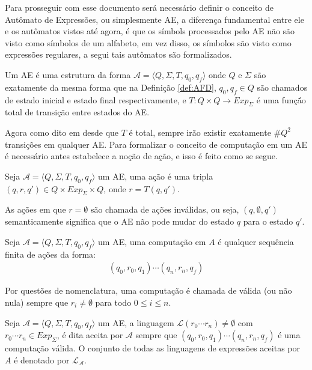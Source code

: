 Para prosseguir com esse documento será necessário definir o conceito de Autômato de Expressões, ou simplesmente AE, a diferença fundamental entre ele e os autômatos vistos até agora, é que os símbols processados pelo AE não são visto como símbolos de um alfabeto, em vez disso, os símbolos são visto como expressões regulares, a segui tais autômatos são formalizados.

\begin{definicao}\label{def:ExpressionAutomaton}
	Um AE é uma estrutura da forma $\mathcal{A} = \langle Q, \Sigma, T, q_0, q_f \rangle$ onde $Q$ e $\Sigma$ são exatamente da mesma forma que na Definição \ref{def:AFD}, $q_0, q_f \in Q$ são chamados de estado inicial e estado final respectivamente, e $T : Q \times Q \rightarrow Exp_\Sigma$ é uma funçã́o total de transição entre estados do AE.
\end{definicao}

Agora como dito em \cite{han2005} desde que $T$ é total, sempre irão existir exatamente $\# Q^2$ transições em qualquer AE. Para formalizar o conceito de computação em um AE é necessário antes estabelece a noção de ação, e isso é feito como se segue.

\begin{definicao}
	Seja $\mathcal{A} = \langle Q, \Sigma, T, q_0, q_f \rangle$ um AE, uma ação é uma tripla $(q, r, q') \in Q \times Exp_\Sigma \times Q$, onde $r = T(q, q')$.
\end{definicao}

As ações em que $r = \emptyset$ são chamada de ações inválidas, ou seja, $(q, \emptyset, q')$ semanticamente significa que o AE não pode mudar do estado $q$ para o estado $q'$.

\begin{definicao}[Computação em AE]
	Seja $\mathcal{A} = \langle Q, \Sigma, T, q_0, q_f \rangle$ um AE, uma computação em $A$ é qualquer sequência finita de ações da forma:
	\begin{eqnarray*}
		(q_0, r_0, q_1)\cdots (q_n, r_n, q_f)
	\end{eqnarray*}
\end{definicao}

\begin{nota}
	Por questões de nomenclatura, uma computação é chamada de válida (ou não nula) sempre que $r_i \neq \emptyset$ para todo $0 \leq i \leq n$.
\end{nota}

\begin{definicao}[Linguagens em um AE]
	Seja $\mathcal{A} = \langle Q, \Sigma, T, q_0, q_f \rangle$ um AE, a linguagem $\mathcal{L}(r_0\cdots r_n) \neq \emptyset$ com $r_0\cdots r_n \in Exp_\Sigma$, é dita aceita por $\mathcal{A}$ sempre que $(q_0, r_0, q_1)\cdots (q_n, r_n, q_f)$ é uma computação válida. O conjunto de todas as linguagens de expressões aceitas por $A$  é denotado por $\mathcal{L}_\mathcal{A}$.
\end{definicao}

